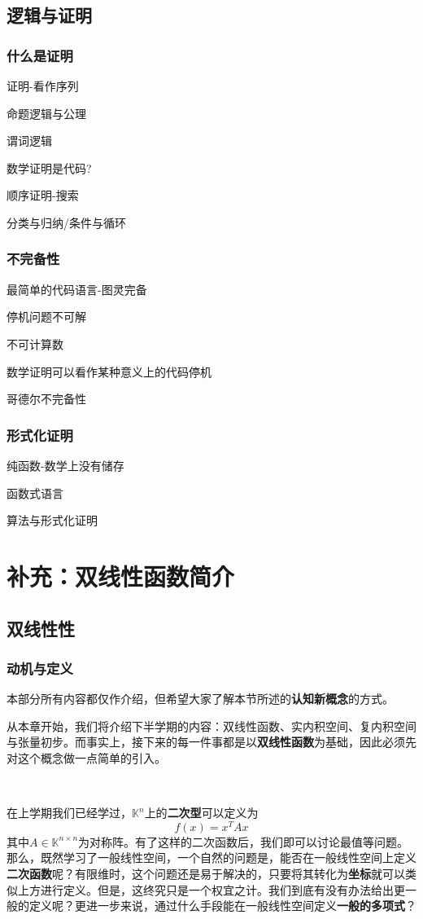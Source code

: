 \documentclass[a4paper,UTF8,fontset=windows,AutoFakeBold]{ctexart}
\newcommand*{\note}{\noindent *}
\begin{document}
\subsection{逻辑与证明}
\subsubsection{什么是证明}
证明-看作序列

命题逻辑与公理

谓词逻辑

数学证明是代码?

顺序证明-搜索

分类与归纳/条件与循环

\subsubsection{不完备性}
最简单的代码语言-图灵完备

停机问题不可解

不可计算数

数学证明可以看作某种意义上的代码停机

哥德尔不完备性

\subsubsection{形式化证明}
纯函数-数学上没有储存

函数式语言

算法与形式化证明

\section{补充：双线性函数简介}
\subsection{双线性性}
\subsubsection{动机与定义}
\note 本部分所有内容都仅作介绍，但希望大家了解本节所述的\textbf{认知新概念}的方式。

从本章开始，我们将介绍下半学期的内容：双线性函数、实内积空间、复内积空间与张量初步。而事实上，接下来的每一件事都是以\textbf{双线性函数}为基础，因此必须先对这个概念做一点简单的引入。

\

在上学期我们已经学过，$\mathbb{K}^n$上的\textbf{二次型}可以定义为
$$f(x)=x^TAx$$
其中$A\in\mathbb{K}^{n\times n}$为对称阵。有了这样的二次函数后，我们即可以讨论最值等问题。那么，既然学习了一般线性空间，一个自然的问题是，能否在一般线性空间上定义\textbf{二次函数}呢？有限维时，这个问题还是易于解决的，只要将其转化为\textbf{坐标}就可以类似上方进行定义。但是，这终究只是一个权宜之计。我们到底有没有办法给出更一般的定义呢？更进一步来说，通过什么手段能在一般线性空间定义\textbf{一般的多项式}？
\end{document}

